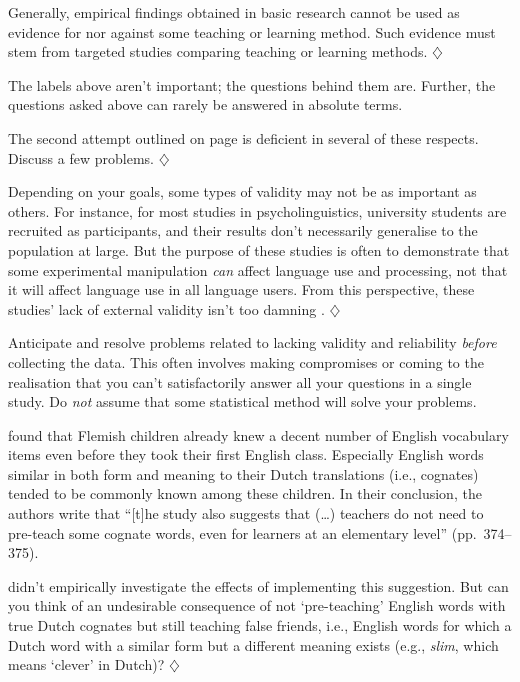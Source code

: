 \documentclass[a4paper]{tufte-book}\usepackage[]{graphicx}\usepackage[]{xcolor}
\newcommand*{\parend}[1][$\diamondsuit$]{%
  \unskip\nobreak\hspace{1em plus 1fill}$\diamondsuit$%
}
\begin{document}
Generally, empirical findings obtained in basic research cannot be used
as evidence for nor against some teaching or learning method.
Such evidence must stem from targeted studies comparing teaching or learning
methods.
\parend
\medskip

The labels above aren't important; the questions behind them are.
Further, the questions asked above can rarely be answered in absolute terms.

The second attempt outlined on page \pageref{sec:beispiel} is deficient 
in several of these respects. Discuss a few problems.
\parend

Depending on your goals, some types of validity
may not be as important as others.
For instance, for most studies in psycholinguistics,
university students are recruited as participants,
and their results don't necessarily generalise
to the population at large. But the purpose of these
studies is often to demonstrate that some
experimental manipulation \emph{can} affect
language use and processing, not that
it will affect language use in all language users.
From this perspective, these studies' lack
of external validity isn't too damning \citep{Mook1983}.
\parend

\begin{framed}
 Anticipate and resolve problems
related to lacking validity and reliability
\emph{before} collecting the data. This often
involves making compromises or coming to the
realisation that you can't satisfactorily
answer all your questions in a single study.
Do \emph{not} assume that some statistical method
will solve your problems.
\end{framed}

  \citet{DeWilde2020} found that Flemish children already knew
  a decent number of English vocabulary items even before they took their
  first English class.
  Especially English words similar in both form and meaning to their 
  Dutch translations (i.e., cognates) tended to be commonly known among
  these children.
  In their conclusion, the authors write that
  ``[t]he study also suggests that (\dots) teachers do not need to pre-teach
  some cognate words, even for learners at an elementary level'' (pp.~374--375).
  
  \citet{DeWilde2020} didn't empirically investigate the effects of implementing
  this suggestion. But can you think of an undesirable consequence
  of not `pre-teaching' English words with true Dutch cognates
  but still teaching false friends, i.e., English words for which a Dutch
  word with a similar form but a different meaning exists 
  (e.g., \textit{slim}, which means `clever' in Dutch)?
\parend
\end{document}
